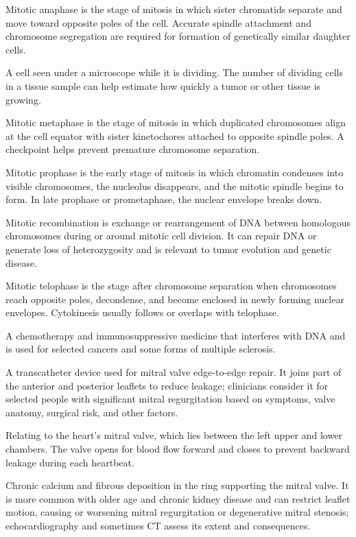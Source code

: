  Mitotic anaphase is the stage of mitosis in which sister chromatids separate and move toward opposite poles of the cell. Accurate spindle attachment and chromosome segregation are required for formation of genetically similar daughter cells.

 A cell seen under a microscope while it is dividing. The number of dividing cells in a tissue sample can help estimate how quickly a tumor or other tissue is growing.

 Mitotic metaphase is the stage of mitosis in which duplicated chromosomes align at the cell equator with sister kinetochores attached to opposite spindle poles. A checkpoint helps prevent premature chromosome separation.

 Mitotic prophase is the early stage of mitosis in which chromatin condenses into visible chromosomes, the nucleolus disappears, and the mitotic spindle begins to form. In late prophase or prometaphase, the nuclear envelope breaks down.

 Mitotic recombination is exchange or rearrangement of DNA between homologous chromosomes during or around mitotic cell division. It can repair DNA or generate loss of heterozygosity and is relevant to tumor evolution and genetic disease.

 Mitotic telophase is the stage after chromosome separation when chromosomes reach opposite poles, decondense, and become enclosed in newly forming nuclear envelopes. Cytokinesis usually follows or overlaps with telophase.

 A chemotherapy and immunosuppressive medicine that interferes with DNA and is used for selected cancers and some forms of multiple sclerosis.

 A transcatheter device used for mitral valve edge-to-edge repair. It joins part of the anterior and posterior leaflets to reduce leakage; clinicians consider it for selected people with significant mitral regurgitation based on symptoms, valve anatomy, surgical risk, and other factors.

 Relating to the heart's mitral valve, which lies between the left upper and lower chambers. The valve opens for blood flow forward and closes to prevent backward leakage during each heartbeat.

 Chronic calcium and fibrous deposition in the ring supporting the mitral valve. It is more common with older age and chronic kidney disease and can restrict leaflet motion, causing or worsening mitral regurgitation or degenerative mitral stenosis; echocardiography and sometimes CT assess its extent and consequences.

